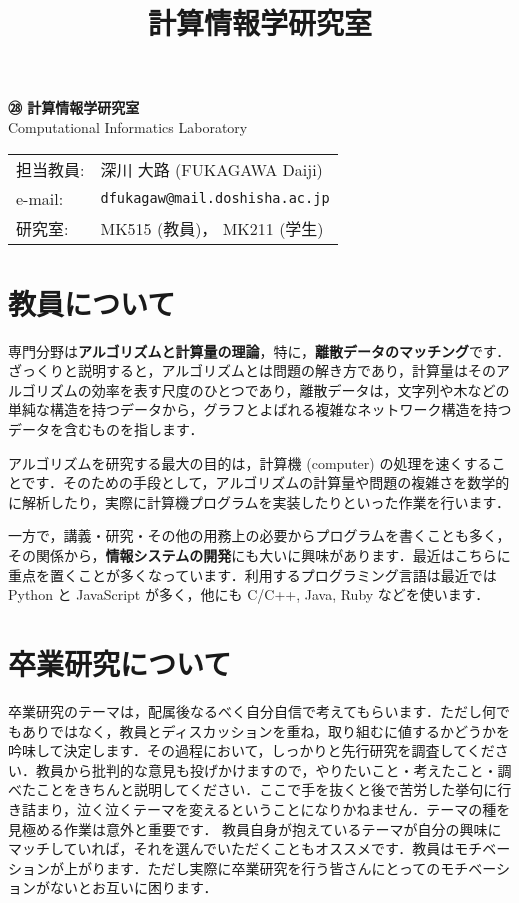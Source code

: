 \documentclass[uplatex,jis2004,a4paper]{jsarticle}
\title{計算情報学研究室}
\date{}
\renewcommand{\emph}[1]{\textbf{#1}}
\begin{document}
\begin{minipage}[t]{.5\textwidth}
\noindent
{\Huge\bfseries\rmfamily ㉘ 計算情報学研究室}\\
\hspace{1cm} Computational Informatics Laboratory
\end{minipage}
\begin{minipage}[t]{.45\textwidth}
\begin{tabular}{ll}
担当教員: & 深川 大路 (FUKAGAWA Daiji) \\
e-mail: & \texttt{dfukagaw@mail.doshisha.ac.jp} \\
研究室: & MK515 (教員)， MK211 (学生)
\end{tabular}
\end{minipage}


\section{教員について}

専門分野は\emph{アルゴリズムと計算量の理論}，特に，\emph{離散データのマッチング}です．
ざっくりと説明すると，アルゴリズムとは問題の解き方であり，計算量はそのアルゴリズムの効率を表す尺度のひとつであり，離散データは，文字列や木などの単純な構造を持つデータから，グラフとよばれる複雑なネットワーク構造を持つデータを含むものを指します．

アルゴリズムを研究する最大の目的は，計算機 (computer) の処理を速くすることです．そのための手段として，アルゴリズムの計算量や問題の複雑さを数学的に解析したり，実際に計算機プログラムを実装したりといった作業を行います．

一方で，講義・研究・その他の用務上の必要からプログラムを書くことも多く，その関係から，\emph{情報システムの開発}にも大いに興味があります．最近はこちらに重点を置くことが多くなっています．利用するプログラミング言語は最近では Python と JavaScript が多く，他にも C/C++, Java, Ruby などを使います．

\section{卒業研究について}

卒業研究のテーマは，配属後なるべく自分自信で考えてもらいます．ただし何でもありではなく，教員とディスカッションを重ね，取り組むに値するかどうかを吟味して決定します．その過程において，しっかりと先行研究を調査してください．教員から批判的な意見も投げかけますので，やりたいこと・考えたこと・調べたことをきちんと説明してください．ここで手を抜くと後で苦労した挙句に行き詰まり，泣く泣くテーマを変えるということになりかねません．テーマの種を見極める作業は意外と重要です．
教員自身が抱えているテーマが自分の興味にマッチしていれば，それを選んでいただくこともオススメです．教員はモチベーションが上がります．ただし実際に卒業研究を行う皆さんにとってのモチベーションがないとお互いに困ります．
\end{document}
